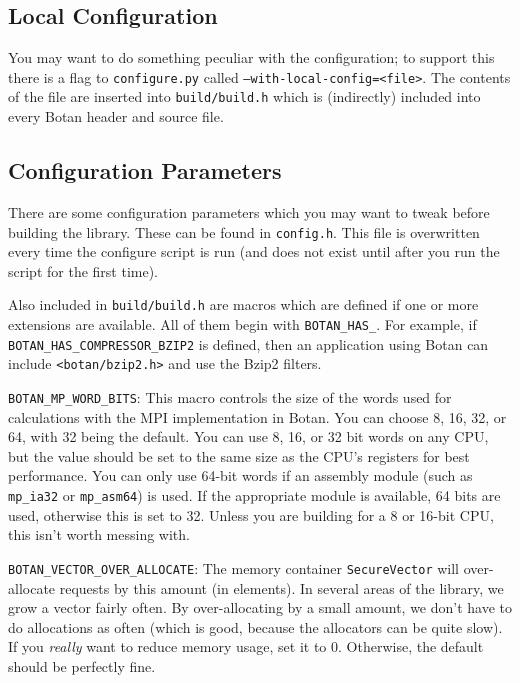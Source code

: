 \documentclass{article}
\newcommand{\filename}[1]{\texttt{#1}}
\newcommand{\module}[1]{\texttt{#1}}
\newcommand{\type}[1]{\texttt{#1}}
\newcommand{\macro}[1]{\texttt{#1}}
\begin{document}
\subsection{Local Configuration}

You may want to do something peculiar with the configuration; to
support this there is a flag to \filename{configure.py} called
\texttt{--with-local-config=<file>}. The contents of the file are
inserted into \filename{build/build.h} which is (indirectly) included
into every Botan header and source file.

\subsection{Configuration Parameters}

There are some configuration parameters which you may want to tweak
before building the library. These can be found in
\filename{config.h}. This file is overwritten every time the configure
script is run (and does not exist until after you run the script for
the first time).

Also included in \filename{build/build.h} are macros which are defined
if one or more extensions are available. All of them begin with
\verb|BOTAN_HAS_|. For example, if \verb|BOTAN_HAS_COMPRESSOR_BZIP2|
is defined, then an application using Botan can include
\filename{<botan/bzip2.h>} and use the Bzip2 filters.

\macro{BOTAN\_MP\_WORD\_BITS}: This macro controls the size of the
words used for calculations with the MPI implementation in Botan. You
can choose 8, 16, 32, or 64, with 32 being the default. You can use 8,
16, or 32 bit words on any CPU, but the value should be set to the
same size as the CPU's registers for best performance. You can only
use 64-bit words if an assembly module (such as \module{mp\_ia32} or
\module{mp\_asm64}) is used. If the appropriate module is available,
64 bits are used, otherwise this is set to 32. Unless you are building
for a 8 or 16-bit CPU, this isn't worth messing with.

\macro{BOTAN\_VECTOR\_OVER\_ALLOCATE}: The memory container
\type{SecureVector} will over-allocate requests by this amount (in
elements). In several areas of the library, we grow a vector fairly often. By
over-allocating by a small amount, we don't have to do allocations as often
(which is good, because the allocators can be quite slow). If you \emph{really}
want to reduce memory usage, set it to 0. Otherwise, the default should be
perfectly fine.
\end{document}
